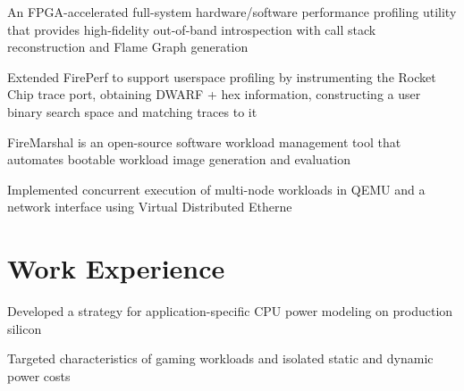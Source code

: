 \documentclass[]{deedy-resume-openfont}
\begin{document}
\begin{minipage}[t]{0.64\textwidth}
\begin{tightemize}
{\normalsize
\item An FPGA-accelerated full-system hardware/software performance profiling utility that provides high-fidelity out-of-band introspection with call stack reconstruction and Flame Graph generation
\item Extended FirePerf to support userspace profiling by instrumenting the Rocket Chip trace port, obtaining DWARF + hex information, constructing a user binary search space and matching traces to it
}
\end{tightemize}

\begin{tightemize}
{\normalsize
\item FireMarshal is an open-source software workload management tool that automates bootable workload image generation and evaluation
\item Implemented concurrent execution of multi-node workloads in QEMU and a network interface using Virtual Distributed Etherne
}
\end{tightemize}



\section{Work Experience}
{\normalsize
\begin{tightemize}
\item Developed a strategy for application-specific CPU power modeling on production silicon
\item Targeted characteristics of gaming workloads and isolated static and dynamic power costs
\end{tightemize}
}


\end{minipage}
\end{document}

